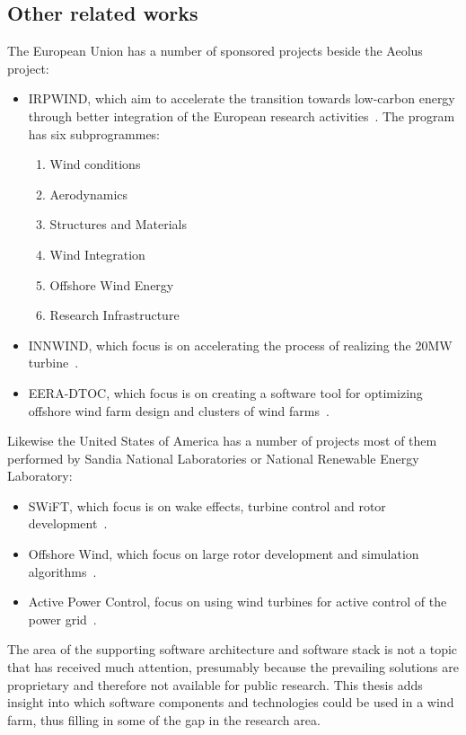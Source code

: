 \subsection{Other related works}
The European Union has a number of sponsored projects beside the Aeolus project:
\begin{itemize}
	\item IRPWIND, which aim to accelerate the transition towards low-carbon energy through better integration of the European research activities~\cite{IRPWIND}. The program has six subprogrammes:
	\begin{enumerate}
		\item Wind conditions
		\item Aerodynamics
		\item Structures and Materials
		\item Wind Integration
		\item Offshore Wind Energy
		\item Research Infrastructure
	\end{enumerate}
	\item INNWIND, which focus is on accelerating the process of realizing the 20MW turbine~\cite{INNWIND}.
	\item EERA-DTOC, which focus is on creating a software tool for optimizing offshore wind farm design and clusters of wind farms~\cite{eera-dtoc}.
\end{itemize}

Likewise the  United States of America has a number of projects most of them performed by Sandia National Laboratories or National Renewable Energy Laboratory:
\begin{itemize}
	\item SWiFT, which focus is on wake effects, turbine control and rotor development~\cite{SWiFT}.
	\item Offshore Wind, which focus on large rotor development and simulation algorithms~\cite{offshoreWind}.
	\item Active Power Control, focus on using wind turbines for active control of the power grid~\cite{activePowerControl}.
\end{itemize}

The area of the supporting software architecture and software stack is not a topic that has received much attention, presumably because the prevailing solutions are proprietary and therefore not available for public research.
This thesis adds insight into which software components and technologies could be used in a wind farm, thus filling in some of the gap in the research area.

